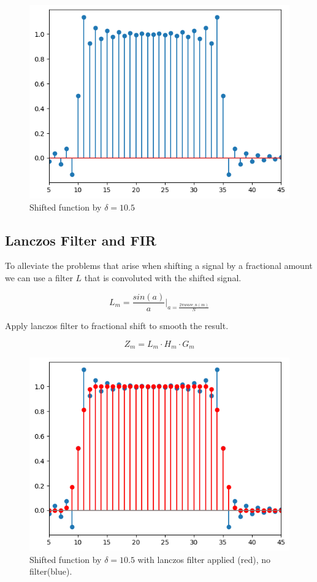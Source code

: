 \documentclass[]{usiinfbachelorproject}
\begin{document}
	

	
	\begin{figure}[h]
		\centering
		\includegraphics[width=0.5\columnwidth]{images/box_shifted_delta10_1_n50.png}
		\caption{Shifted function by $\delta=10.5$}
	\end{figure}
	
	
	\subsection{Lanczos Filter and FIR}
	To alleviate the problems that arise when shifting a signal by a fractional amount we can use a filter $L$ that is convoluted with the shifted signal.
	
	\begin{equation*}
		L_m = \frac{sin(a)}{a} |_{a = \frac{2\pi wave\_n(m)}{N}}
	\end{equation*}
	
	Apply lanczos filter to fractional shift to smooth the result.
	
	\begin{equation*}
		Z_m = L_m \cdot H_m \cdot G_m
	\end{equation*}
	\begin{figure}[h]
		\centering
		\includegraphics[width=0.5\columnwidth]{images/box_shifted_lanczos_delta10_1_n50.png}
		\caption{Shifted function by $\delta=10.5$ with lanczos filter applied (red), no filter(blue).}
	\end{figure}
	
	
	\newpage
	
\end{document}
